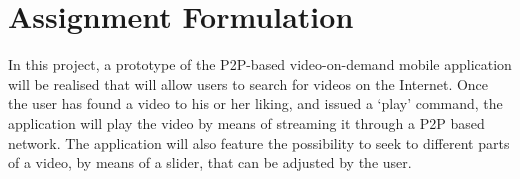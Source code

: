\section{Assignment Formulation}
In this project, a prototype of the P2P-based video-on-demand mobile application will be realised that will allow users to search for videos on the Internet. Once the user has found a video to his or her liking, and issued a ‘play’ command, the application will play the video by means of streaming it through a P2P based network. The application will also feature the possibility to seek to different parts of a video, by means of a slider, that can be adjusted by the user.
